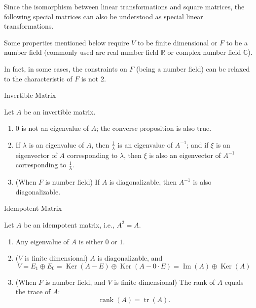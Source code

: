 \documentclass[11pt]{../../TexTemplate/elegantbook} %
\begin{document}
Since the isomorphism between linear transformations and square matrices,
the following special matrices can also be understood as special linear transformations.

\begin{remark}
    Some properties mentioned below require \(V\) to be finite dimensional
    or \(F\) to be a number field 
    (commonly used are real number field \( \mathbb{R} \) or complex number field \( \mathbb{C} \)).

    In fact, in some cases, the constraints on \(F\) (being a number field) can be relaxed to
    the characteristic of \(F\) is not \(2\).
\end{remark}

\begin{leftbarTitle}{Invertible Matrix}\end{leftbarTitle}
Let \(A\) be an invertible matrix.

\begin{enumerate}
    \item \(0\) is not an eigenvalue of \(A\); the converse proposition is also true.
    \item If \(\lambda\) is an eigenvalue of \(A\), then \(\frac{1}{\lambda}\) is an eigenvalue of \(A^{-1}\);
        and if \(\xi\) is an eigenvector of \(A\) corresponding to \(\lambda\),
        then \(\xi\) is also an eigenvector of \(A^{-1}\) corresponding to \(\frac{1}{\lambda}\).
    \item (When \(F\) is number field) If \(A\) is diagonalizable, then \(A^{-1}\) is also diagonalizable.
\end{enumerate}


\begin{leftbarTitle}{Idempotent Matrix}\end{leftbarTitle}
Let \(A\) be an idempotent matrix, i.e., \(A^2 = A\).

\begin{enumerate}
    \item Any eigenvalue of \(A\) is either \(0\) or \(1\).
    \item (\(V\) is finite dimensional) \(A\) is diagonalizable, and
        \[
        V = E_{1} \oplus E_{0} = \operatorname{Ker}(A-E) \oplus \operatorname{Ker}(A-0\cdot E) 
        = \operatorname{Im}(A)\oplus \operatorname{Ker}(A) 
        \]
    \item (When \(F\) is number field, and \(V\) is finite dimensional) The rank of \(A\) equals the trace of \(A\):
        \[
        \operatorname{rank}(A) = \operatorname{tr}(A).
        \]
\end{enumerate}
\end{document}
